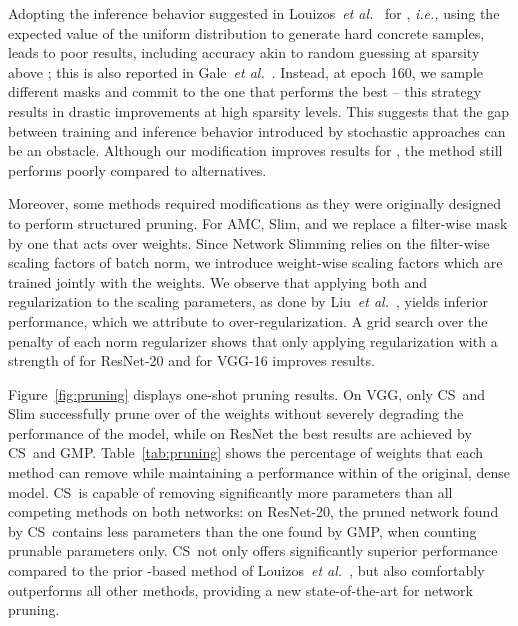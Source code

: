 \documentclass{article}
\newcommand{\ie}{\textit{i.e.,} }
\newcommand{\etal}{\textit{et al.}}
\newcommand{\methodacro}{CS}
\begin{document}
Adopting the inference behavior suggested in Louizos~\etal~\cite{sparsityl0} for , \ie using the expected value of the uniform distribution to generate hard concrete samples, leads to poor results, including accuracy akin to random guessing at sparsity above ; this is also reported in Gale~\etal~\cite{stateofsparsity}. Instead, at epoch 160, we sample different masks and commit to the one that performs the best -- this strategy results in drastic improvements at high sparsity levels. This suggests that the gap between training and inference behavior introduced by stochastic approaches can be an obstacle. Although our modification improves results for , the method still performs poorly compared to alternatives.

Moreover, some methods required modifications as they were originally designed to perform structured pruning. For AMC, Slim, and  we replace a filter-wise mask by one that acts over weights. Since Network Slimming relies on the filter-wise scaling factors of batch norm, we introduce weight-wise scaling factors which are trained jointly with the weights. We observe that applying both  and  regularization to the scaling parameters, as done by Liu~\etal~\cite{slim}, yields inferior performance, which we attribute to over-regularization. A grid search over the penalty of each norm regularizer shows that only applying  regularization with a strength of  for ResNet-20 and  for VGG-16 improves results.

Figure~\ref{fig:pruning} displays one-shot pruning results. On VGG, only \methodacro~and Slim successfully prune over  of the weights without severely degrading the performance of the model, while on ResNet the best results are achieved by \methodacro~and GMP. Table~\ref{tab:pruning} shows the percentage of weights that each method can remove while maintaining a performance within  of the original, dense model. \methodacro~is capable of removing significantly more parameters than all competing methods on both networks: on ResNet-20, the pruned network found by \methodacro~contains  less parameters than the one found by GMP, when counting prunable parameters only. \methodacro~not only offers significantly superior performance compared to the prior -based method of Louizos~\etal~\cite{sparsityl0}, but also comfortably outperforms all other methods, providing a new state-of-the-art for network pruning.
\end{document}
